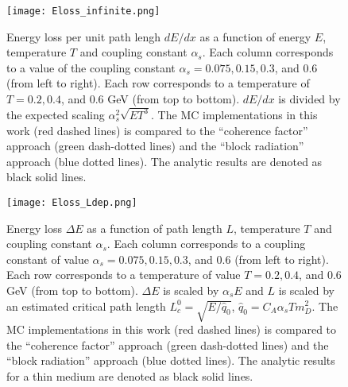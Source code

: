 \begin{figure}
\singlespacing
\centering
\texttt{[image: Eloss\_infinite.png]}
\caption[Energy loss per unit path lengh $dE/dx$ as a function of energy $E$,]{Energy loss per unit path lengh $dE/dx$ as a function of energy $E$, temperature $T$ and coupling constant $\alpha_s$. Each column corresponds to a value of the coupling constant $\alpha_s = 0.075, 0.15, 0.3$, and $0.6$ (from left to right). Each row corresponds to a temperature of $T = 0.2, 0.4$, and $0.6$ GeV (from top to bottom). $dE/dx$ is divided by the expected scaling $\alpha_s^2 \sqrt{ET^3}$. The MC implementations in this work (red dashed lines) is compared to the ``coherence factor'' approach (green dash-dotted lines) and the ``block radiation'' approach (blue dotted lines). The analytic results are denoted as black solid lines.}
\label{fig:eloss-inf}
\end{figure}

\begin{figure}
\singlespacing
\centering
\texttt{[image: Eloss\_Ldep.png]}
\caption[Energy loss $\Delta E$ as a function of path length $L$, temperature $T$]{Energy loss $\Delta E$ as a function of path length $L$, temperature $T$ and coupling constant $\alpha_s$. Each column corresponds to a coupling constant of value $\alpha_s = 0.075, 0.15, 0.3$, and $0.6$ (from left to right). Each row corresponds to a temperature of value $T = 0.2, 0.4$, and $0.6$ GeV (from top to bottom). $\Delta E$ is scaled by $\alpha_s E$ and $L$ is scaled by an estimated critical path length $L_c^0 = \sqrt{E/\hat{q}_0}$, $\hat{q}_0 = C_A \alpha_s T m_D^2$. The MC implementations in this work (red dashed lines) is compared to the ``coherence factor'' approach (green dash-dotted lines) and the ``block radiation'' approach (blue dotted lines). The analytic results for a thin medium are denoted as black solid lines.}
\label{fig:eloss-ldep}
\end{figure}

